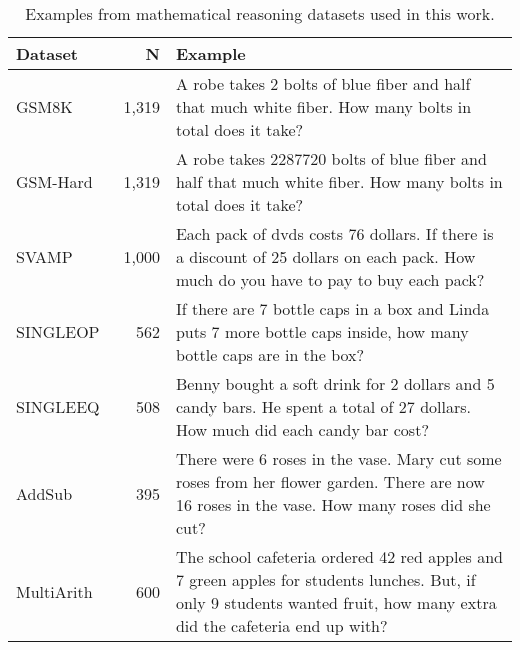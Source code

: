 
\begin{table}[ht!]
\centering
\caption{Examples from mathematical reasoning datasets used in this work.}
\begin{tabular}{@{}lrp{6.5cm}@{}}
\toprule
Dataset   & N     & Example                                                                                                \\ \midrule
GSM8K~\citep{cobbe2021gsm8k} &
  1,319 &
  A robe takes 2 bolts of blue fiber and half that much white fiber.  How many bolts in total does it take? \\
GSM-Hard~\citep{gao2022pal} &
  1,319 &
  A robe takes 2287720 bolts of blue fiber and half that much white fiber.  How many bolts in total does it take? \\
SVAMP~\citep{patel2021svamp}    & 1,000 & Each pack of dvds costs 76 dollars. If there is a discount of 25 dollars on each pack. How much do you have to pay to buy each pack?        \\                                
SINGLEOP~\citep{koncel2016mawps} & 562   & If there are 7 bottle caps in a box and Linda puts 7 more bottle caps inside, how many bottle caps are in the box?                          \\
SINGLEEQ~\citep{koncel2016mawps}  & 508   & Benny bought a soft drink for 2 dollars and 5 candy bars. He spent a total of 27 dollars. How much did each candy bar cost?                 \\
AddSub~\citep{hosseini2014addsub}    & 395   & There were 6 roses in the vase. Mary cut some roses from her flower garden. There are now 16 roses in the vase. How many roses did she cut? \\
MultiArith~\citep{roy2015multiarith}  &
  600 &
  The school cafeteria ordered 42 red apples and 7 green apples for students lunches. But, if only 9 students wanted fruit, how many extra did the cafeteria end up with? \\ 
\bottomrule
\end{tabular}
\label{tab:math:examples}
\end{table}